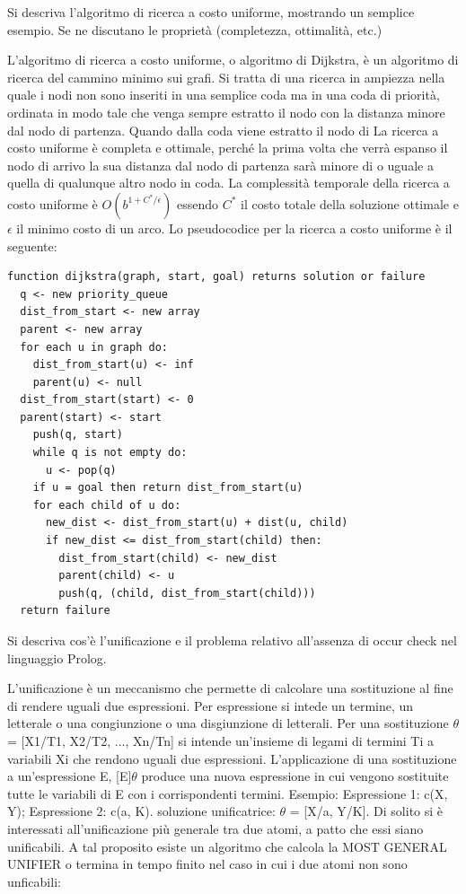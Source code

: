 \documentclass[answers, a4paper, 11pt]{exam}
\begin{document}
\begin{questions}
\question Si descriva l’algoritmo di ricerca a costo uniforme, mostrando un semplice esempio. Se ne discutano le
proprietà (completezza, ottimalità, etc.)
\begin{solution}
	L'algoritmo di ricerca a costo uniforme, o algoritmo di Dijkstra, è un algoritmo di ricerca del cammino minimo sui grafi. 
  Si tratta di una ricerca in ampiezza nella quale i nodi non sono inseriti in una semplice coda ma in una coda di priorità, ordinata in modo tale che venga sempre estratto il nodo con la distanza minore dal nodo di partenza. 
  Quando dalla coda viene estratto il nodo di 
  La ricerca a costo uniforme è completa e ottimale, perché la prima volta che verrà espanso il nodo di arrivo la sua distanza dal nodo di partenza sarà minore di o uguale a quella di qualunque altro nodo in coda. 
  La complessità temporale della ricerca a costo uniforme è $O(b^{1 + C^*/\epsilon})$ essendo $C^*$ il costo totale della soluzione ottimale  e $\epsilon$ il minimo costo di un arco. 
	Lo pseudocodice per la ricerca a costo uniforme è il seguente:
	\begin{verbatim}
function dijkstra(graph, start, goal) returns solution or failure
  q <- new priority_queue
  dist_from_start <- new array
  parent <- new array
  for each u in graph do:
    dist_from_start(u) <- inf
    parent(u) <- null
  dist_from_start(start) <- 0
  parent(start) <- start
	push(q, start)
	while q is not empty do:
	  u <- pop(q)
    if u = goal then return dist_from_start(u)
    for each child of u do:
      new_dist <- dist_from_start(u) + dist(u, child) 
      if new_dist <= dist_from_start(child) then:
        dist_from_start(child) <- new_dist
        parent(child) <- u
        push(q, (child, dist_from_start(child)))
  return failure
	\end{verbatim}
\end{solution}
\question Si descriva cos’è l'unificazione e il problema relativo all’assenza di occur check nel linguaggio Prolog.
\begin{solution}
  L'unificazione è un meccanismo che permette di calcolare una sostituzione al fine di rendere uguali due espressioni. Per espressione si intede un termine, un letterale o una congiunzione o una disgiunzione di letterali.
  Per una sostituzione $\theta$ = [X1/T1, X2/T2, ..., Xn/Tn] si intende un'insieme di legami di termini Ti a variabili Xi che rendono uguali due espressioni. L'applicazione di una sostituzione a un'espressione E, [E]$\theta$ produce una nuova espressione in cui vengono sostituite tutte le variabili di E con i corrispondenti termini.
  Esempio: Espressione 1: c(X, Y); Espressione 2: c(a, K). soluzione unificatrice: $\theta$ = [X/a, Y/K]. \newline
  Di solito si è interessati all'unificazione più generale tra due atomi, a patto che essi siano unificabili. A tal proposito esiste un algoritmo che calcola la MOST GENERAL UNIFIER o termina in tempo finito nel caso in cui i due atomi non sono unficabili:


\end{solution}
\end{questions}
\end{document}
